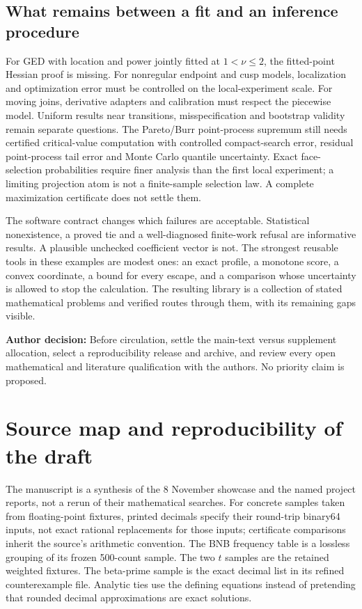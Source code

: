 \documentclass[12pt]{article}
\theoremstyle{definition}
\theoremstyle{remark}
\newcommand{\todo}[1]{\par\smallskip\noindent\textcolor{red!65!black}{\textbf{Author decision:} #1}\par\smallskip}
\begin{document}
\subsection{What remains between a fit and an inference procedure}
For GED with location and power jointly fitted at $1<\nu\le2$, the
fitted-point Hessian proof is missing. For nonregular endpoint and cusp
models, localization and optimization error must be controlled on the
local-experiment scale. For moving joins, derivative adapters and
calibration must respect the piecewise model. Uniform results near
transitions, misspecification and bootstrap validity remain separate
questions. The Pareto/Burr point-process supremum still needs certified
critical-value computation with controlled compact-search error, residual
point-process tail error and Monte Carlo quantile uncertainty. Exact
face-selection probabilities require finer analysis than the first local
experiment; a limiting projection atom is not a finite-sample selection law. A complete maximization certificate does not settle them.

The software contract changes which failures are acceptable. Statistical
nonexistence, a proved tie and a well-diagnosed finite-work refusal are
informative results. A plausible unchecked coefficient vector is not.
The strongest reusable tools in these examples are modest ones: an exact
profile, a monotone score, a convex coordinate, a bound for every escape,
and a comparison whose uncertainty is allowed to stop the calculation.
The resulting library is a collection of stated mathematical problems and
verified routes through them, with its remaining gaps visible.
\todo{Before circulation, settle the main-text versus supplement allocation, select a reproducibility release and archive, and review every open mathematical and literature qualification with the authors. No priority claim is proposed.}

\appendix
\section{Source map and reproducibility of the draft}\label{app:sources}
The manuscript is a synthesis of the 8 November showcase and the named
project reports, not a rerun of their mathematical searches. For concrete
samples taken from floating-point fixtures, printed decimals specify their
round-trip binary64 inputs, not exact rational replacements for those inputs;
certificate comparisons inherit the source's arithmetic convention. The
BNB frequency table is a lossless grouping of its frozen 500-count sample.
The two $t$ samples are the retained weighted fixtures. The beta-prime
sample is the exact decimal list in its refined counterexample file.
Analytic ties use the defining equations instead of pretending that
rounded decimal approximations are exact solutions.
\end{document}
